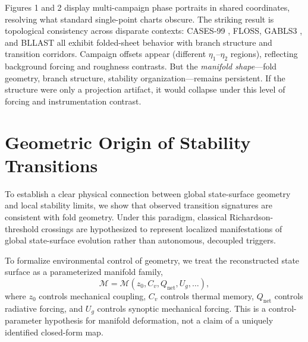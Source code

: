 \documentclass[12pt,a4paper]{article}
\begin{document}
Figures 1 and 2 display multi-campaign phase portraits in shared coordinates, resolving what standard single-point charts obscure. The striking result is topological consistency across disparate contexts: CASES-99 \citep{poulos2002}, FLOSS, GABLS3 \citep{beare2004}, and BLLAST all exhibit folded-sheet behavior with branch structure and transition corridors. Campaign offsets appear (different $\eta_1\text{--}\eta_2$ regions), reflecting background forcing and roughness contrasts. But the \emph{manifold shape}---fold geometry, branch structure, stability organization---remains persistent. If the structure were only a projection artifact, it would collapse under this level of forcing and instrumentation contrast.

\section{Geometric Origin of Stability Transitions}

To establish a clear physical connection between global state-surface geometry and local stability limits, we show that observed transition signatures are consistent with fold geometry. Under this paradigm, classical Richardson-threshold crossings are hypothesized to represent localized manifestations of global state-surface evolution rather than autonomous, decoupled triggers.

To formalize environmental control of geometry, we treat the reconstructed state surface as a parameterized manifold family,
\begin{equation}
\mathcal{M} = \mathcal{M}(z_0, C_v, Q_{\text{net}}, U_g, \ldots),
\end{equation}
where $z_0$ controls mechanical coupling, $C_v$ controls thermal memory, $Q_{\text{net}}$ controls radiative forcing, and $U_g$ controls synoptic mechanical forcing. This is a control-parameter hypothesis for manifold deformation, not a claim of a uniquely identified closed-form map.
\end{document}
